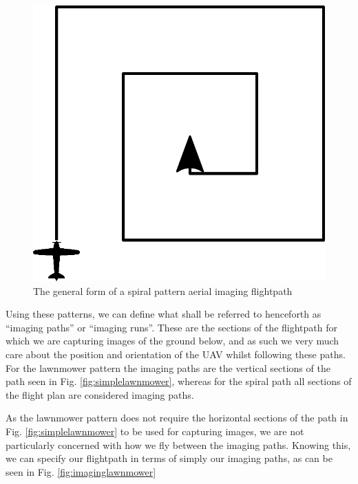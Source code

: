 \begin{figure}[htbp!] 
\centering    
\includegraphics[width=0.3\textheight]{SimpleSpiral}
\caption[Simple Spiral Pattern]{The general form of a spiral pattern aerial imaging flightpath}
\label{fig:simplespiral}
\end{figure}

Using these patterns, we can define what shall be referred to henceforth as ``imaging paths'' or ``imaging runs''. These are the sections of the flightpath for which we are capturing images of the ground below, and as such we very much care about the position and orientation of the UAV whilst following these paths. For the lawnmower pattern the imaging paths are the vertical sections of the path seen in Fig. \ref{fig:simplelawnmower}, whereas for the spiral path all sections of the flight plan are considered imaging paths. 

As the lawnmower pattern does not require the horizontal sections of the path in Fig. \ref{fig:simplelawnmower} to be used for capturing images, we are not particularly concerned with how we fly between the imaging paths. Knowing this, we can specify our flightpath in terms of simply our imaging paths, as can be seen in Fig. \ref{fig:imaginglawnmower}

